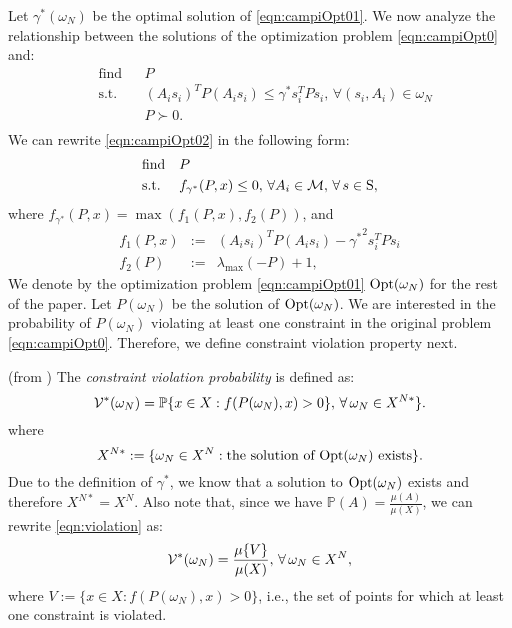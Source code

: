 Let $\gamma^*(\omega_N)$ be the optimal solution of \eqref{eqn:campiOpt01}. We now analyze the relationship between the solutions of the optimization problem \eqref{eqn:campiOpt0} and:
\begin{equation}\label{eqn:campiOpt02}
\begin{aligned}
& \text{find} & & P \\
& \text{s.t.} 
&  & (A_is_i)^TP(A_is_i) \leq \gamma^* s_i^TPs_i,\,\forall (s_i,A_i) \in \omega_N \\
& && P \succ 0. \\
\end{aligned}
\end{equation}
We can rewrite \eqref{eqn:campiOpt02} in the following form:
\begin{equation}
\label{eqn:campiOpt2}
\begin{aligned}
& \text{find} & & P \\
& \text{s.t.} 
& & f_{\gamma^*}(P, x) \leq 0,\,\forall A_i \in \mathcal{M}, \,\forall\, s \in \text{S}, \end{aligned}
\end{equation}
where $f_{\gamma^*}(P,x) = \max(f_1(P, x), f_2(P))$, and 
\begin{eqnarray*}
f_1(P, x) &:=& (A_is_i)^TP(A_is_i) - {\gamma^*}^2 s_i^TPs_i \\
f_2(P) &:=& \lambda_{\max}(-P) +1,
\end{eqnarray*}
We denote by the optimization problem \eqref{eqn:campiOpt01} $\text{Opt}(\omega_N)$ for the rest of the paper. Let $P(\omega_N)$ be the solution of $\text{Opt}(\omega_N)$. We are interested in the probability of $P(\omega_N)$ violating at least one constraint in the original problem \eqref{eqn:campiOpt0}. Therefore, we define constraint violation property next.

\begin{definition}(from \cite{campi}) The \emph{constraint violation probability} is defined as:
\begin{equation}\label{eqn:violation}
\mathcal{V}^*(\omega_N)=
      \mathbb{P}\{x \in X: f(P(\omega_N), x) > 0\},\, \forall\, \omega_N \in X^{N*}\}.
\end{equation}
where $$X^{N*}:=\{\omega_N \in X^N: \text{the solution of $\text{Opt}(\omega_N)$ exists}\}.$$ 
Due to the definition of $\gamma^*$, we know that a solution to $\text{Opt}(\omega_N)$ exists and therefore $X^{N*} = X^N$. Also note that, since we have $\mathbb{P}(A) = \frac{\mu(A)}{\mu(X)}$, we can rewrite \eqref{eqn:violation} as:
\begin{equation*}
\mathcal{V}^*(\omega_N)=
      \frac{\mu\{V\}}{\mu(X)},\, \forall\, \omega_N \in X^N,
\end{equation*}
where $V:=\{x \in X: f(P(\omega_N),x) > 0\}$, i.e., the set of points for which at least one constraint is violated.
\end{definition}

